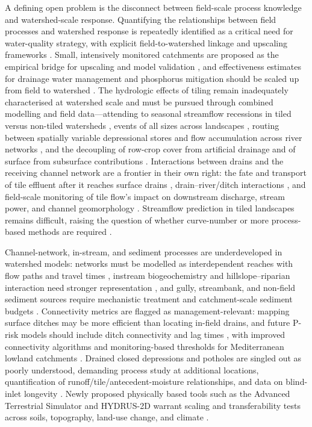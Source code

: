 A defining open problem is the disconnect between field-scale process knowledge
and watershed-scale response. Quantifying the relationships between field
processes and watershed response is repeatedly identified as a critical need for
water-quality strategy, with explicit field-to-watershed linkage and upscaling
frameworks \parencite{Williams2015,Williams2017,Wang2020b}. Small, intensively
monitored catchments are proposed as the empirical bridge for upscaling and
model validation \parencite{Kyllmar2023,Basu2010}, and effectiveness estimates
for drainage water management and phosphorus mitigation should be scaled up from
field to watershed \parencite{Wang2021,Ross2016,Shedekar2021}. The hydrologic
effects of tiling remain inadequately characterised at watershed scale and must
be pursued through combined modelling and field data---attending to seasonal
streamflow recessions in tiled versus non-tiled watersheds
\parencite{Schilling2008,Schilling2012}, events of all sizes across landscapes
\parencite{Sloan2017}, routing between spatially variable depressional stores and
flow accumulation across river networks \parencite{Sloan2016,Fonley2021}, and the
decoupling of row-crop cover from artificial drainage and of surface from
subsurface contributions \parencite{BolandBrien2014}. Interactions between drains
and the receiving channel network are a frontier in their own right: the fate and
transport of tile effluent after it reaches surface drains
\parencite{Clement2017}, drain--river/ditch interactions \parencite{Grangeon2021},
and field-scale monitoring of tile flow's impact on downstream discharge, stream
power, and channel geomorphology \parencite{Zhou2025,Zhou2013}. Streamflow
prediction in tiled landscapes remains difficult, raising the question of whether
curve-number or more process-based methods are required
\parencite{Wessel2022,Thomas2016,Rahman2014}.

Channel-network, in-stream, and sediment processes are underdeveloped in
watershed models: networks must be modelled as interdependent reaches with flow
paths and travel times \parencite{Giraud1997,Williamson2025}, instream
biogeochemistry and hillslope--riparian interaction need stronger representation
\parencite{Schilling2012b,Basu2010}, and gully, streambank, and non-field
sediment sources require mechanistic treatment and catchment-scale sediment
budgets \parencite{Maalim2013,Dalzell2018,Walling2002}. Connectivity metrics are
flagged as management-relevant: mapping surface ditches may be more efficient than
locating in-field drains, and future P-risk models should include ditch
connectivity and lag times \parencite{Moloney2020,Opoku2024}, with improved
connectivity algorithms and monitoring-based thresholds for Mediterranean lowland
catchments \parencite{Calsamiglia2018}. Drained closed depressions and potholes
are singled out as poorly understood, demanding process study at additional
locations, quantification of runoff/tile/antecedent-moisture relationships, and
data on blind-inlet longevity \parencite{Martin2019,Williams2020,Feyereisen2015b}.
Newly proposed physically based tools such as the Advanced Terrestrial Simulator
and HYDRUS-2D warrant scaling and transferability tests across soils,
topography, land-use change, and climate
\parencite{Rathore2025,Naderi2025,Basu2010}.


